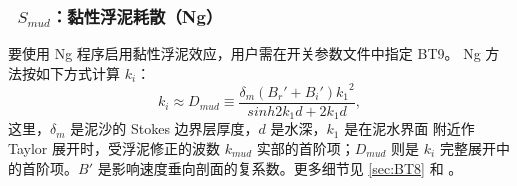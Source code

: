 \vsssub
\subsubsection{~$S_{mud}$：黏性浮泥耗散（Ng）} \label{sec:BT9}
\vsssub


\noindent
要使用 Ng 程序启用黏性浮泥效应，用户需在开关参数文件中指定 {\code BT9}。
Ng 方法按如下方式计算 $k_i$：
\begin{equation}\label{eq:dmud3}
  k_i \approx {D_{mud}} \equiv \frac{\delta_m({B_r'}+{B_i'}){k_1}^2}{sinh2{k_1}{d}+2{k_1}{d}},
\end{equation}
这里，${\delta_m}$ 是泥沙的 Stokes 边界层厚度，${d}$ 是水深，${k_1}$ 是在泥水界面
附近作 Taylor 展开时，受浮泥修正的波数 $k_{mud}$ 实部的首阶项；${D_{mud}}$ 则是
$k_i$ 完整展开中的首阶项。$B'$ 是影响速度垂向剖面的复系数。更多细节见
\para\ref{sec:BT8} 和 \cite{art:Ng00}。
